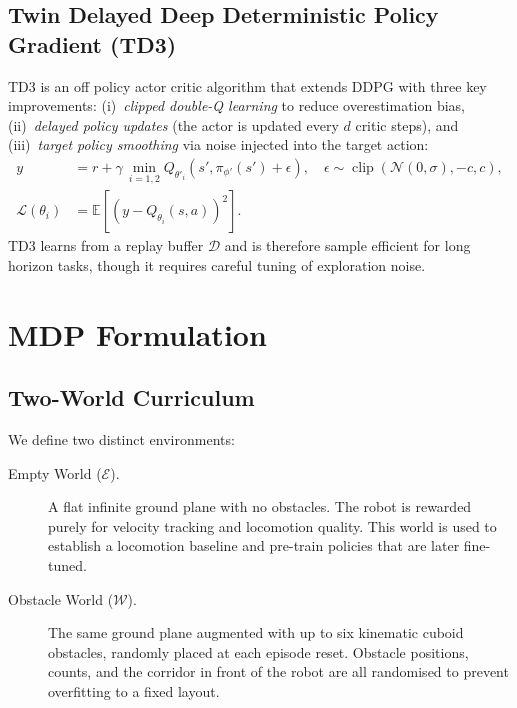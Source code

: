 \documentclass{article}
\begin{document}
\subsection{Twin Delayed Deep Deterministic Policy Gradient (TD3)}

TD3 \cite{fujimoto2018addressing} is an off policy actor critic algorithm
that extends DDPG \cite{lillicrap2015continuous} with three key
improvements: (i)~\emph{clipped double-Q learning} to reduce overestimation
bias, (ii)~\emph{delayed policy updates} (the actor is updated every $d$
critic steps), and (iii)~\emph{target policy smoothing} via noise injected
into the target action:
\begin{align}
  y &= r + \gamma\,\min_{i=1,2} Q_{\theta'_i}\!\left(s', \pi_{\phi'}(s') + \epsilon\right),
      \quad \epsilon \sim \operatorname{clip}(\mathcal{N}(0,\sigma),{-c},{c}), \\
  \mathcal{L}(\theta_i) &= \mathbb{E}\!\left[(y - Q_{\theta_i}(s,a))^2\right].
\end{align}
TD3 learns from a replay buffer $\mathcal{D}$ and is therefore sample efficient
for long horizon tasks, though it requires careful tuning of exploration noise.

\section{MDP Formulation}

\subsection{Two-World Curriculum}

We define two distinct environments:

\begin{description}
  \item[Empty World ($\mathcal{E}$).] A flat infinite ground plane with no
        obstacles. The robot is rewarded purely for velocity tracking and
        locomotion quality. This world is used to establish a locomotion
        baseline and pre-train policies that are later fine-tuned.
  \item[Obstacle World ($\mathcal{W}$).] The same ground plane augmented with
        up to six kinematic cuboid obstacles, randomly placed at each episode
        reset. Obstacle positions, counts, and the corridor in front of the
        robot are all randomised to prevent overfitting to a fixed layout.
\end{description}
\end{document}
